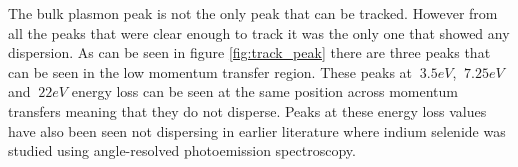 The bulk plasmon peak is not the only peak that can be tracked. However from all the peaks that were clear enough to track it was the only one that showed any dispersion. As can be seen in figure \ref{fig:track_peak} there are three peaks that can be seen in the low momentum transfer region. These peaks at $~3.5eV$, $~7.25eV$ and $~22eV$ energy loss can be seen at the same position across momentum transfers meaning that they do not disperse. Peaks at these energy loss values have also been seen not dispersing in earlier literature \cite{Politano2017} where indium selenide was studied using angle-resolved photoemission spectroscopy.